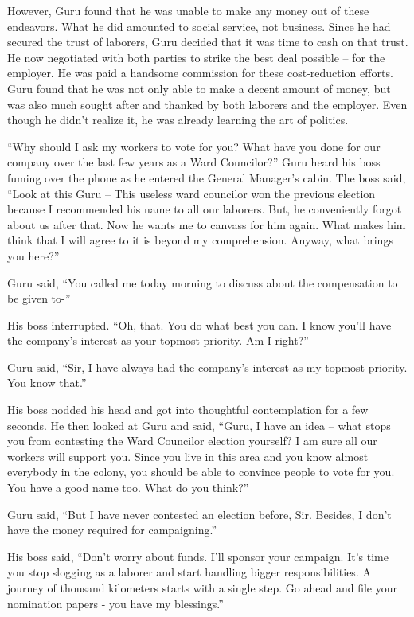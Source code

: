 However, Guru found that he was unable to make any money out of these endeavors.
What he did amounted to social service, not business. Since he had secured the
trust of laborers, Guru decided that it was time to cash on that trust. He now
negotiated with both parties to strike the best deal possible – for the
employer. He was paid a handsome commission for these cost-reduction efforts.
Guru found that he was not only able to make a decent amount of money, but was
also much sought after and thanked by both laborers and the employer. Even
though he didn't realize it, he was already learning the art of politics.

“Why should I ask my workers to vote for you? What have you done for our company
over the last few years as a Ward Councilor?” Guru heard his boss fuming over
the phone as he entered the General Manager's cabin. The boss said, “Look at
this Guru – This useless ward councilor won the previous election because I
recommended his name to all our laborers. But, he conveniently forgot about us
after that. Now he wants me to canvass for him again. What makes him think that
I will agree to it is beyond my comprehension. Anyway, what brings you here?”

Guru said, “You called me today morning to discuss about the compensation to be
given to-”

His boss interrupted. “Oh, that. You do what best you can. I know you'll have
the company's interest as your topmost priority. Am I right?”

Guru said, “Sir, I have always had the company's interest as my topmost
priority. You know that.”

His boss nodded his head and got into thoughtful contemplation for a few
seconds. He then looked at Guru and said, “Guru, I have an idea – what stops you
from contesting the Ward Councilor election yourself? I am sure all our workers
will support you. Since you live in this area and you know almost everybody in
the colony, you should be able to convince people to vote for you. You have a
good name too. What do you think?”

Guru said, “But I have never contested an election before, Sir. Besides, I don't
have the money required for campaigning.”

His boss said, “Don't worry about funds. I'll sponsor your campaign. It's time
you stop slogging as a laborer and start handling bigger responsibilities. A
journey of thousand kilometers starts with a single step. Go ahead and file your
nomination papers - you have my blessings.”

